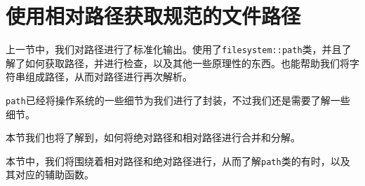 \section{使用相对路径获取规范的文件路径}

上一节中，我们对路径进行了标准化输出。使用了\texttt{filesystem::path}类，并且了解了如何获取路径，并进行检查，以及其他一些原理性的东西。也能帮助我们将字符串组成路径，从而对路径进行再次解析。

\texttt{path}已经将操作系统的一些细节为我们进行了封装，不过我们还是需要了解一些细节。

本节我们也将了解到，如何将绝对路径和相对路径进行合并和分解。


本节中，我们将围绕着相对路径和绝对路径进行，从而了解\texttt{path}类的有时，以及其对应的辅助函数。

